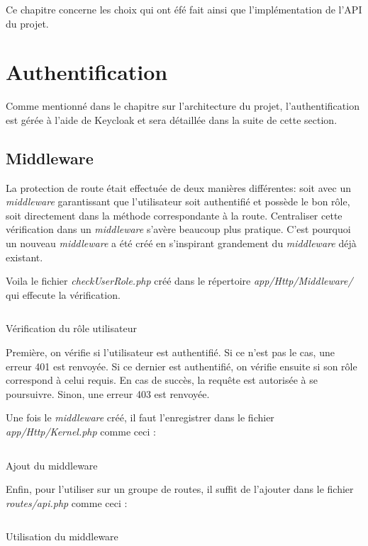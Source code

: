 Ce chapitre concerne les choix qui ont éfé fait ainsi que l'implémentation de l'API du projet.

\section{Authentification}
Comme mentionné dans le chapitre sur l'architecture du projet, l'authentification est gérée à l'aide de Keycloak et sera détaillée dans la suite de cette section.

\subsection{Middleware}
La protection de route était effectuée de deux manières différentes: soit avec un \emph{middleware} garantissant que l'utilisateur soit authentifié et possède le bon rôle, soit directement dans la méthode correspondante à la route. Centraliser cette vérification dans un \emph{middleware} s'avère beaucoup plus pratique. C'est pourquoi un nouveau \emph{middleware} a été créé en s'inspirant grandement du \emph{middleware} déjà existant.

Voila le fichier \emph{checkUserRole.php} créé dans le répertoire \emph{app/Http/Middleware/} qui effecute la vérification.

\begin{listing}[H]
    \inputminted{php}{assets/code/checkUserRole.php}
    \caption{Vérification du rôle utilisateur}
\end{listing}

Première, on vérifie si l'utilisateur est authentifié. Si ce n'est pas le cas, une erreur 401 est renvoyée. Si ce dernier est authentifié, on vérifie ensuite si son rôle correspond à celui requis. En cas de succès, la requête est autorisée à se poursuivre. Sinon, une erreur 403 est renvoyée.

Une fois le \emph{middleware} créé, il faut l'enregistrer dans le fichier \emph{app/Http/Kernel.php} comme ceci :

\begin{listing}[H]
    \inputminted{php}{assets/code/addMiddleware.php}
    \caption{Ajout du middleware}
\end{listing}

Enfin, pour l'utiliser sur un groupe de routes, il suffit de l'ajouter dans le fichier \emph{routes/api.php} comme ceci :
\begin{listing}[H]
    \inputminted{php}{assets/code/middlewareRoutes.php}
    \caption{Utilisation du middleware}
\end{listing}

